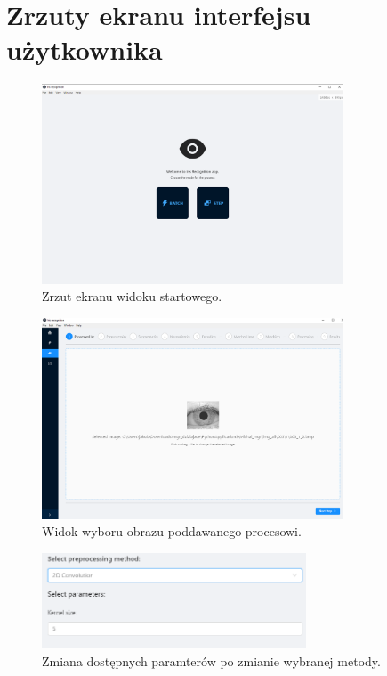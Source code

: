 
\chapter{Zrzuty ekranu interfejsu użytkownika}
\label{appendix:appScreenShots}

\begin{figure}[ht]
  \centering
  \includegraphics[width=0.8\textwidth]{images/app/home.png}
  \caption{Zrzut ekranu widoku startowego.}
  \label{fig:homeScreen}
\end{figure}

\begin{figure}[ht]
  \centering
  \includegraphics[width=0.8\textwidth]{images/app/step1.png}
  \caption{Widok wyboru obrazu poddawanego procesowi.}
  \label{fig:processingImageSelectionScreen}
\end{figure}

\begin{figure}[ht]
  \centering
  \includegraphics[width=0.7\textwidth]{images/app/preprocessingOtherMethod.png}
  \caption{Zmiana dostępnych paramterów po zmianie wybranej metody.}
  \label{fig:preprocessingOtherMethod}
\end{figure}

